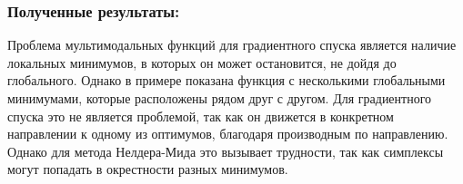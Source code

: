 \documentclass{article}
\begin{document}
\subsubsection*{Полученные результаты:}
Проблема мультимодальных функций для градиентного спуска является наличие локальных минимумов, в которых он может остановится, не дойдя до глобального. Однако в примере показана функция с несколькими глобальными минимумами, которые расположены рядом друг с другом. Для градиентного спуска это не является проблемой, так как он движется в конкретном направлении к одному из оптимумов, благодаря производным по направлению. Однако для метода Нелдера-Мида это вызывает трудности, так как симплексы могут попадать в окрестности разных минимумов. 
\end{document}
